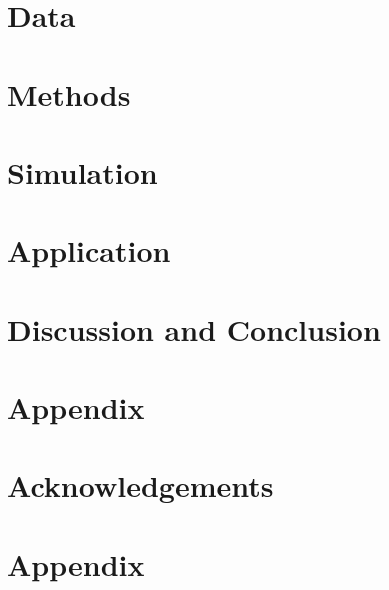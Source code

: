 \documentclass[12pt, letterpaper]{article}
\begin{document}
\section{Data}
\label{sec:data}
\section{Methods}
\label{sec:methods}


\section{Simulation}
\label{sec:somulation}


\section{Application}
\label{sec:application}


\section{Discussion and Conclusion}
\label{sec:discandconclus}


\section{Appendix}
\label{sec:appendix}


\section{Acknowledgements}
\label{sec:acknow}


\section{Appendix}
\label{sec:appendix}


\end{document}
